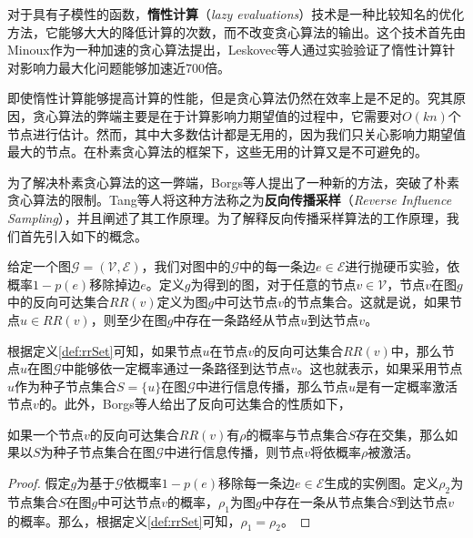 对于具有子模性的函数，\textbf{惰性计算}（\textit{lazy evaluations}）技术是一种比较知名的优化方法，它能够大大的降低计算的次数，而不改变贪心算法的输出。这个技术首先由Minoux作为一种加速的贪心算法提出，Leskovec等人通过实验验证了惰性计算针对影响力最大化问题能够加速近700倍。

即使惰性计算能够提高计算的性能，但是贪心算法仍然在效率上是不足的。究其原因，贪心算法的弊端主要是在于计算影响力期望值的过程中，它需要对$O\left(kn\right)$个节点进行估计。然而，其中大多数估计都是无用的，因为我们只关心影响力期望值最大的节点。在朴素贪心算法的框架下，这些无用的计算又是不可避免的。

为了解决朴素贪心算法的这一弊端，Borgs等人提出了一种新的方法，突破了朴素贪心算法的限制。Tang等人将这种方法称之为\textbf{反向传播采样}（\textit{Reverse Influence Sampling}），并且阐述了其工作原理。为了解释反向传播采样算法的工作原理，我们首先引入如下的概念。

\begin{mydef}[反向可达集合]
\label{def:rrSet}
给定一个图$\mathcal{G}=\left(\mathcal{V}, \mathcal{E}\right)$，我们对图中的$\mathcal{G}$中的每一条边$e \in \mathcal{E}$进行抛硬币实验，依概率$1-p\left(e\right)$移除掉边$e$。定义$g$为得到的图，对于任意的节点$v \in \mathcal{V}$，节点$v$在图$g$中的反向可达集合${RR}\left(v\right)$定义为图$g$中可达节点$v$的节点集合。这就是说，如果节点$u \in {RR}\left(v\right)$，则至少在图$g$中存在一条路经从节点$u$到达节点$v$。
\end{mydef}

根据定义\ref{def:rrSet}可知，如果节点$u$在节点$v$的反向可达集合${RR}\left(v\right)$中，那么节点$u$在图$\mathcal{G}$中能够依一定概率通过一条路径到达节点$v$。这也就表示，如果采用节点$u$作为种子节点集合$S=\{u\}$在图$\mathcal{G}$中进行信息传播，那么节点$u$是有一定概率激活节点$v$的。此外，Borgs等人给出了反向可达集合的性质如下，

\begin{mylem}
\label{lem:rrSet}
如果一个节点$v$的反向可达集合${RR}\left(v\right)$有$\rho$的概率与节点集合$S$存在交集，那么如果以$S$为种子节点集合在图$\mathcal{G}$中进行信息传播，则节点$v$将依概率$\rho$被激活。
\end{mylem}

\begin{proof}
假定$g$为基于$\mathcal{G}$依概率$1-p\left(e\right)$移除每一条边$e \in \mathcal{E}$生成的实例图。定义$\rho_2$为节点集合$S$在图$g$中可达节点$v$的概率，$\rho_1$为图$g$中存在一条从节点集合$S$到达节点$v$的概率。那么，根据定义\ref{def:rrSet}可知，$\rho_1 = \rho_2$。
\end{proof}

